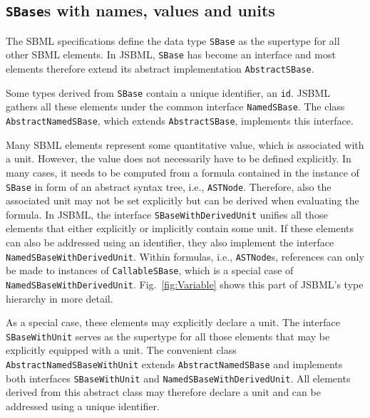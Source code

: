 \documentclass[
  BCOR12mm,
  letterpaper,
  11pt,
  headsepline,
  pointlessnumbers,
  tablecaptionabove,
  onelinecaption,
  headinclude,
  appendixprefix,
  idxtotoc,
  bibtotoc,
  twoside,
  titlepage
]{scrartcl}
\begin{document}
\subsection{\texttt{SBase}s with names, values and units}

The SBML specifications define the data type
\texttt{SBase} as the 
supertype for all other SBML elements. In JSBML, \texttt{SBase} has become an
interface and most elements therefore extend its abstract implementation
\texttt{AbstractSBase}.

Some types derived from \texttt{SBase} contain a unique identifier, an
\texttt{id}. JSBML gathers all these elements under the common interface
\texttt{NamedSBase}. The class \texttt{AbstractNamedSBase}, which extends
\texttt{AbstractSBase}, implements this interface.

Many SBML elements represent some quantitative value, which is associated with a
unit. However, the value does not necessarily have to be defined explicitly. In
many cases, it needs to be computed from a formula contained in the instance of
\texttt{SBase} in form of an abstract syntax tree, i.e., \texttt{ASTNode}.
Therefore, also the associated unit may not be set explicitly but can be derived
when evaluating the formula. In JSBML, the interface
\texttt{SBaseWithDerivedUnit}
unifies all those elements
that either explicitly or implicitly contain some unit. If these elements can
also be addressed using an identifier, they also implement the interface
\texttt{NamedSBaseWithDerivedUnit}.
Within formulas, i.e., \texttt{ASTNode}s,
references can only be made to instances of \texttt{CallableSBase},
which is a
special case of \texttt{NamedSBaseWithDerivedUnit}.
Fig.~\vref{fig:Variable} shows this part of JSBML's type hierarchy in more
detail.

As a special case, these elements may explicitly declare a unit. The interface
\texttt{SBaseWithUnit}
serves as the supertype for all those elements that may
be explicitly equipped with a unit. The convenient class
\texttt{AbstractNamedSBaseWithUnit}
extends \texttt{AbstractNamedSBase} and
implements both interfaces \texttt{SBaseWithUnit} and
\texttt{NamedSBaseWithDerivedUnit}.
All elements derived from this abstract
class may therefore declare a unit and can be addressed using a unique
identifier.
\end{document}
